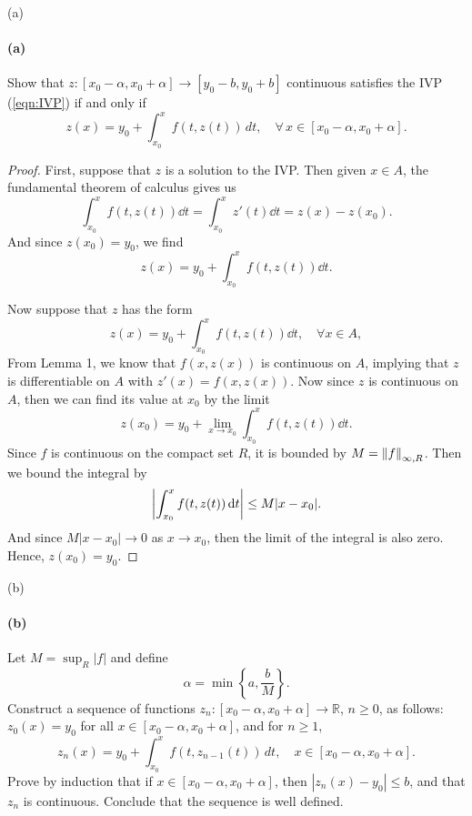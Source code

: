 \documentclass[12pt]{article}
\newenvironment{fullbox}{\begin{lrbox}{\savefullbox}\begin{minipage}{\dimexpr\textwidth-2\fboxsep\relax}}{\end{minipage}\end{lrbox}\begin{center}\framebox[\textwidth]{\usebox{\savefullbox}}\end{center}}
\newenvironment{pbox}[1][]{\begin{fullbox}\ifx#1\empty\else\paragraph{#1}\fi}{\end{fullbox}}
\theoremstyle{definition}
\newcommand{\R}{\mathbb{R}}
\begin{document}
\begin{pbox}[(a)]
    Show that $z:[x_0-\alpha,x_0+\alpha]\to [y_0-b,y_0+b]$ continuous satisfies the IVP  (\ref{eqn:IVP}) if and only if 
    \begin{equation}
    z(x) = y_0 + \int_{x_0}^x f(t,z(t))\,dt,\quad \forall\, x \in [x_0-\alpha,x_0+\alpha].
    \end{equation}
\end{pbox}

\begin{proof}
    First, suppose that $z$ is a solution to the IVP. Then given $x \in A$, the fundamental theorem of calculus gives us
    \[
        \int_{x_0}^{x} f(t, z(t)) \dd{t}
            = \int_{x_0}^{x} z'(t) \dd{t}
            = z(x) - z(x_0).
    \]
    And since $z(x_0) = y_0$, we find
    \[
        z(x) = y_0 + \int_{x_0}^{x} f(t, z(t)) \dd{t}.
    \]
    
    Now suppose that $z$ has the form
    \[
        z(x) = y_0 + \int_{x_0}^{x} f(t, z(t)) \dd{t}, \quad \forall x \in A,
    \]
    From Lemma 1, we know that $f(x, z(x))$ is continuous on $A$, implying that $z$ is differentiable on $A$ with $z'(x) = f(x, z(x))$. Now since $z$ is continuous on $A$, then we can find its value at $x_0$ by the limit
    \[
        z(x_0) = y_0 + \lim_{x \to x_0} \int_{x_0}^{x} f(t, z(t)) \dd{t}.
    \]
    Since $f$ is continuous on the compact set $R$, it is bounded by $M = \norm{f}_{\infty, R}$. Then we bound the integral by
    \[
        \abs{\int_{x_0}^{x} f(t, z(t)) \dd{t}}
            \leq M|x - x_0|.
    \]
    And since $M|x - x_0| \to 0$ as $x \to x_0$, then the limit of the integral is also zero. Hence, $z(x_0) = y_0$.
    
    
    
\end{proof}




\newpage
\begin{pbox}[(b)]
    Let $M = \sup_R |f|$ and define 
    \begin{equation}
    \alpha = \min \left \{ a, \frac{b}{M}\right \}.
    \end{equation}
    Construct a sequence of functions $z_n:[x_0-\alpha,x_0+\alpha]\to \R$, $n\ge 0$,  as follows: $z_0(x) = y_0$ for all $x \in [x_0-\alpha,x_0+\alpha]$, and for $n \ge 1$, 
    \begin{equation}
    z_n(x) = y_0 + \int_{x_0}^x f(t,z_{n-1}(t))\,dt,\quad x \in [x_0-\alpha,x_0+\alpha].
    \end{equation}
    Prove by induction that if $x \in [x_0-\alpha,x_0+\alpha]$, then $|z_n(x) - y_0|\le b$, and that $z_n$ is continuous. Conclude that the sequence is well defined. 
\end{pbox}
\end{document}
